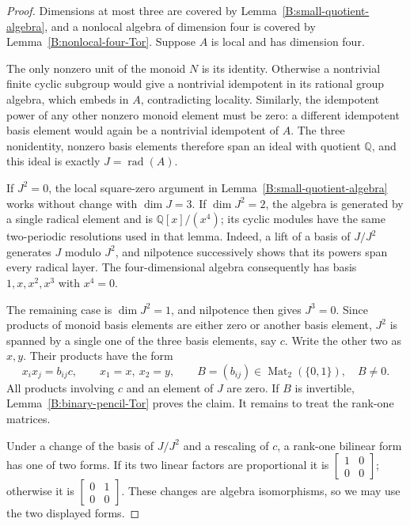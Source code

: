 \begin{proof}
Dimensions at most three are covered by
Lemma~\ref{B:small-quotient-algebra}, and a nonlocal algebra of
dimension four is covered by Lemma~\ref{B:nonlocal-four-Tor}.
Suppose $A$ is local and has dimension four.

The only nonzero unit of the monoid $N$ is its identity.  Otherwise
a nontrivial finite cyclic subgroup would give a nontrivial
idempotent in its rational group algebra, which embeds in $A$,
contradicting locality.  Similarly, the idempotent power of any
other nonzero monoid element must be zero: a different idempotent
basis element would again be a nontrivial idempotent of $A$.
The three nonidentity, nonzero basis elements therefore span an
ideal with quotient $\mathbb Q$, and this ideal is exactly
$J=\operatorname{rad}(A)$.

If $J^2=0$, the local square-zero argument in
Lemma~\ref{B:small-quotient-algebra} works without change with
$\dim J=3$.  If $\dim J^2=2$, the algebra is generated by a
single radical element and is $\mathbb Q[x]/(x^4)$; its cyclic
modules have the same two-periodic resolutions used in that lemma.
Indeed, a lift of a basis of $J/J^2$ generates $J$ modulo $J^2$,
and nilpotence successively shows that its powers span every
radical layer.  The four-dimensional algebra consequently has
basis $1,x,x^2,x^3$ with $x^4=0$.

The remaining case is $\dim J^2=1$, and nilpotence then gives
$J^3=0$.  Since products of monoid basis elements are either zero
or another basis element, $J^2$ is spanned by a single one of the
three basis elements, say $c$.  Write the other two as $x,y$.
Their products have the form
\[
 x_i x_j=b_{ij}c,\qquad x_1=x,\ x_2=y,\qquad
 B=(b_{ij})\in\operatorname{Mat}_2(\{0,1\}),\quad B\ne0.
\]
All products involving $c$ and an element of $J$ are zero.
If $B$ is invertible, Lemma~\ref{B:binary-pencil-Tor} proves the
claim.  It remains to treat the rank-one matrices.

Under a change of the basis of $J/J^2$ and a rescaling of $c$, a
rank-one bilinear form has one of two forms.  If its two linear
factors are proportional it is
$\left[\begin{smallmatrix}1&0\\0&0\end{smallmatrix}\right]$;
otherwise it is
$\left[\begin{smallmatrix}0&1\\0&0\end{smallmatrix}\right]$.
These changes are algebra isomorphisms, so we may use the two
displayed forms.


\end{proof}
